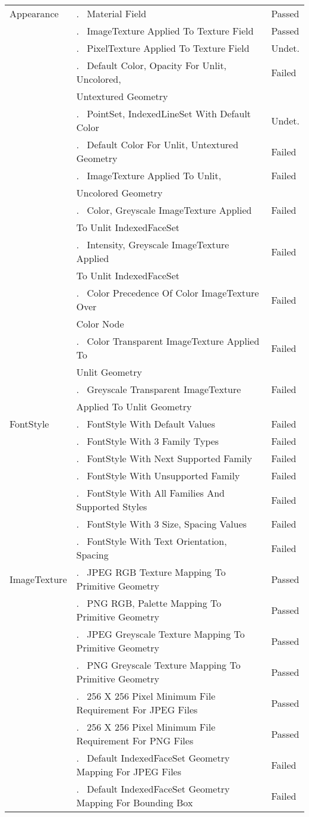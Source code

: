 \documentclass[12pt,letterpaper]{article}
\newcounter{testCaseCtr}
\newcommand{\testCase}{\arabic{testCaseCtr}.~ \stepcounter{testCaseCtr}}
\newcommand{\resetTestCase}{\setcounter{testCaseCtr}{1}}
\newcommand{\AppA}{Material Field}
\newcommand{\AppB}{ImageTexture Applied To Texture Field}
\newcommand{\AppC}{PixelTexture Applied To Texture Field}
\newcommand{\AppDa}{Default Color, Opacity For Unlit, Uncolored,~}
\newcommand{\AppDb}{Untextured Geometry}
\newcommand{\AppE}{PointSet, IndexedLineSet With Default Color}
\newcommand{\AppF}{Default Color For Unlit, Untextured Geometry}
\newcommand{\AppGa}{ImageTexture Applied To Unlit,~}
\newcommand{\AppGb}{Uncolored Geometry}
\newcommand{\AppHa}{Color, Greyscale ImageTexture Applied~}
\newcommand{\AppHb}{To Unlit IndexedFaceSet}
\newcommand{\AppIa}{Intensity, Greyscale ImageTexture Applied~}
\newcommand{\AppIb}{To Unlit IndexedFaceSet}
\newcommand{\AppJa}{Color Precedence Of Color ImageTexture Over~}
\newcommand{\AppJb}{Color Node}
\newcommand{\AppKa}{Color Transparent ImageTexture Applied To~}
\newcommand{\AppKb}{Unlit Geometry}
\newcommand{\AppLa}{Greyscale Transparent ImageTexture~}
\newcommand{\AppLb}{Applied To Unlit Geometry}
\newcommand{\FSA}{FontStyle With Default Values}
\newcommand{\FSB}{FontStyle With 3 Family Types}
\newcommand{\FSC}{FontStyle With Next Supported Family}
\newcommand{\FSD}{FontStyle With Unsupported Family}
\newcommand{\FSE}{FontStyle With All Families And Supported Styles}
\newcommand{\FSF}{FontStyle With 3 Size, Spacing Values}
\newcommand{\FSG}{FontStyle With Text Orientation, Spacing}
\newcommand{\ITA}{JPEG RGB Texture Mapping To Primitive Geometry}
\newcommand{\ITB}{PNG RGB, Palette Mapping To Primitive Geometry}
\newcommand{\ITC}{JPEG Greyscale Texture Mapping To Primitive Geometry}
\newcommand{\ITD}{PNG Greyscale Texture Mapping To Primitive Geometry}
\newcommand{\ITE}{256 X 256 Pixel Minimum File Requirement For JPEG Files}
\newcommand{\ITF}{256 X 256 Pixel Minimum File Requirement For PNG Files}
\newcommand{\ITG}{Default IndexedFaceSet Geometry Mapping For JPEG Files}
\newcommand{\ITHa}{Default IndexedFaceSet Geometry Mapping For Bounding Box~}
\begin{document}
\begin{center}
\begin{longtable}{|l|l|l|}
Appearance & \testCase \AppA & Passed \\\cline{2-3}
 & \testCase \AppB & Passed \\\cline{2-3}
 & \testCase \AppC & Undet. \\\cline{2-3}
 & \testCase \AppDa & Failed \\
 & \AppDb & \\\cline{2-3}
 & \testCase \AppE & Undet. \\\cline{2-3}
 & \testCase \AppF & Failed \\\cline{2-3}
 & \testCase \AppGa & Failed \\
 & \AppGb & \\\cline{2-3}
 & \testCase \AppHa & Failed \\
 & \AppHb & \\\cline{2-3}
 & \testCase \AppIa & Failed \\
 & \AppIb & \\\cline{2-3}
 & \testCase \AppJa & Failed \\
 & \AppJb & \\\cline{2-3}
 & \testCase \AppKa & Failed \\
 & \AppKb & \\\cline{2-3}
 & \testCase \AppLa & Failed \\
 & \AppLb & \\\hline
\resetTestCase
FontStyle & \testCase \FSA & Failed \\\cline{2-3}
 & \testCase \FSB & Failed \\\cline{2-3}
 & \testCase \FSC & Failed \\\cline{2-3}
 & \testCase \FSD & Failed \\\cline{2-3}
 & \testCase \FSE & Failed \\\cline{2-3}
 & \testCase \FSF & Failed \\\cline{2-3}
 & \testCase \FSG & Failed \\\hline
\resetTestCase
ImageTexture & \testCase \ITA & Passed \\\cline{2-3}
 & \testCase \ITB & Passed \\\cline{2-3}
 & \testCase \ITC & Passed \\\cline{2-3}
 & \testCase \ITD & Passed \\\cline{2-3}
 & \testCase \ITE & Passed \\\cline{2-3}
 & \testCase \ITF & Passed \\\cline{2-3}
 & \testCase \ITG & Failed \\\cline{2-3}
 & \testCase \ITHa & Failed \\

\end{longtable}
\end{center}
\end{document}
